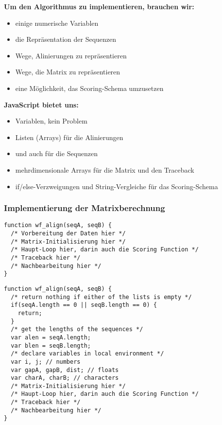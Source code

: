 \par\noindent\textbf{Um den Algorithmus zu implementieren, brauchen wir:}

\begin{itemize}
\itemsep1pt\parskip0pt
\item
  einige numerische Variablen
\item
  die Repräsentation der Sequenzen
\item
  Wege, Alinierungen zu repräsentieren
\item
  Wege, die Matrix zu repräsentieren
\item
  eine Möglichkeit, das Scoring-Schema umzusetzen
\end{itemize}



\par\noindent\textbf{JavaScript bietet uns:}

\begin{itemize}
\itemsep1pt\parskip0pt
\item
  Variablen, kein Problem
\item
  Listen (Arrays) für die Alinierungen
\item
  und auch für die Sequenzen
\item
  mehrdimensionale Arrays für die Matrix und den Traceback
\item
  if/else-Verzweigungen und String-Vergleiche für das Scoring-Schema
\end{itemize}


\subsubsection{\texorpdfstring{{Implementierung der
Matrixberechnung}}{Implementierung der Matrixberechnung}}

\begin{verbatim}
function wf_align(seqA, seqB) {
  /* Vorbereitung der Daten hier */
  /* Matrix-Initialisierung hier */
  /* Haupt-Loop hier, darin auch die Scoring Function */
  /* Traceback hier */
  /* Nachbearbeitung hier */
}
\end{verbatim}



\begin{verbatim}
function wf_align(seqA, seqB) {
  /* return nothing if either of the lists is empty */
  if(seqA.length == 0 || seqB.length == 0) {
    return;
  }
  /* get the lengths of the sequences */
  var alen = seqA.length;
  var blen = seqB.length;
  /* declare variables in local environment */
  var i, j; // numbers
  var gapA, gapB, dist; // floats
  var charA, charB; // characters
  /* Matrix-Initialisierung hier */
  /* Haupt-Loop hier, darin auch die Scoring Function */
  /* Traceback hier */
  /* Nachbearbeitung hier */
}
\end{verbatim}


